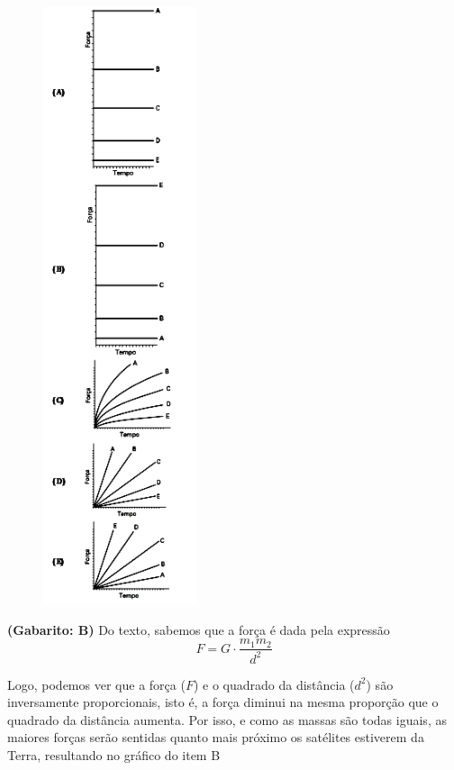 \documentclass[a4paper]{article}
\begin{document}
\begin{figure}[H]
	\begin{center}
		\includegraphics[width=4.5cm]{L2Q25_2.png}
	\end{center}
\end{figure}
\par\textbf{(Gabarito: B)} Do texto, sabemos que a força é dada pela expressão
\begin{equation*}
F = G\cdot\frac{m_1m_2}{d^2}
\end{equation*}
\par\vspace{0.3cm} Logo, podemos ver que a força ($F$) e o quadrado da distância ($d^2$) são inversamente proporcionais, isto é, a força diminui na mesma proporção que o quadrado da distância aumenta. Por isso, e como as massas são todas iguais, as maiores forças serão sentidas quanto mais próximo os satélites estiverem da Terra, resultando no gráfico do item B
\end{document}
